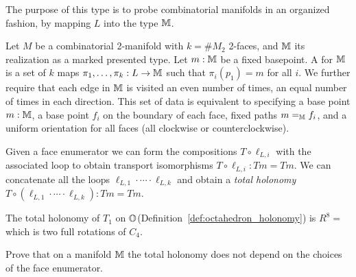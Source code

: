 The purpose of this type is to probe combinatorial manifolds in an organized fashion, by mapping \( L \) into the type \( \mathbb{M} \). 

\begin{mydef}
\label{def:face_enumerator}
Let \( M \) be a combinatorial 2-manifold with \( k=\#M_2 \) 2-faces, and \( \mathbb{M} \) its realization as a marked presented type. Let \( m:\mathbb{M} \) be a fixed basepoint. A  for \( \mathbb{M} \) is a set of \( k \) maps \( \pi_1,\ldots,\pi_k:L\to \mathbb{M} \) such that \( \pi_i(p_1)=m \) for all \( i \). We further require that each edge in \( \mathbb{M} \) is visited an even number of times, an equal number of times in each direction. This set of data is equivalent to specifying a base point \( m:\mathbb{M} \), a base point \( f_i \) on the boundary of each face, fixed paths \( m=_{\mathbb{M}} f_i \), and a uniform orientation for all faces (all clockwise or counterclockwise).
\end{mydef}

Given a face enumerator we can form the compositions \( T\circ\ell_{L,i} \) with the associated loop to obtain transport isomorphisms \( T\circ\ell_{L,i}:Tm=Tm \). We can concatenate all the loops \( \ell_{L,1}\cdot\cdots\cdot\ell_{L,k} \) and obtain a \emph{total holonomy} \( T\circ(\ell_{L,1}\cdot\cdots\cdot\ell_{L,k}):Tm=Tm  \).

\begin{mylemma}
The total holonomy of \( T_1 \) on \( \mathbb{O} \)(Definition~\ref{def:octahedron_holonomy}) is \( R^8=\) which is two full rotations of \( C_4 \).
\end{mylemma}

Prove that on a manifold \( \mathbb{M} \) the total holonomy does not depend on the choices of the face enumerator.

